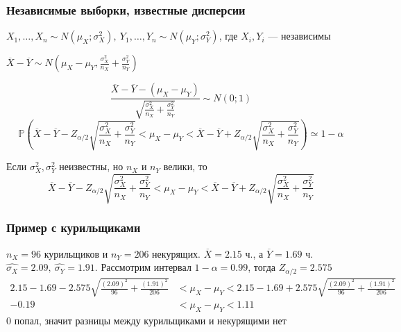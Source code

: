 \documentclass[a4paper, 10pt]{article}
\begin{document}
\subsubsection{Независимые выборки, известные дисперсии}
$X_1,\ldots,X_n\sim N(\mu_X;\sigma^2_X),\ Y_1,\ldots,Y_n\sim N(\mu_Y;\sigma^2_Y)$, где $X_i,Y_i$ — независимы

$\overline{X}-\overline{Y}\sim N(\mu_X-\mu_Y,\frac{\sigma^2_X}{n_X}+\frac{\sigma^2_Y}{n_Y})$

\begin{equation*}
    \frac{\overline{X}-\overline{Y}-(\mu_X-\mu_Y)}{\sqrt{\frac{\sigma^2_X}{n_X}+\frac{\sigma^2_Y}{n_Y}}}\sim N(0;1)
\end{equation*}
\begin{equation*}
    \mathbb{P}\left(\overline{X}-\overline{Y}-Z_{\alpha/2}\sqrt{\frac{\sigma^2_X}{n_X}+\frac{\sigma^2_Y}{n_Y}}<\mu_X-\mu_Y<\overline{X}-\overline{Y}+Z_{\alpha/2}\sqrt{\frac{\sigma^2_X}{n_X}+\frac{\sigma^2_Y}{n_Y}}\right)\simeq1-\alpha
\end{equation*}

\comment Если $\sigma^2_X,\sigma^2_Y$ неизвестны, но $n_X$ и $n_Y$ велики, то 
\begin{equation*}
    \overline{X}-\overline{Y}-Z_{\alpha/2}\sqrt{\frac{\sigma^2_X}{n_X}+\frac{\sigma^2_Y}{n_Y}}<\mu_X-\mu_Y<\overline{X}-\overline{Y}+Z_{\alpha/2}\sqrt{\frac{\sigma^2_X}{n_X}+\frac{\sigma^2_Y}{n_Y}}
\end{equation*}

\subsubsection{Пример с курильщиками}
$n_X=96$ курильщиков и $n_Y=206$ некурящих. $\overline{X}=2.15$ ч., а $\overline{Y}=1.69$ ч. $\widehat{\sigma_X}=2.09,\ \widehat{\sigma_Y}=1.91$. Рассмотрим интервал $1-\alpha=0.99$, тогда $Z_{\alpha/2}=2.575$
\begin{equation*}
    \begin{aligned}
        2.15-1.69-2.575\sqrt{\frac{(2.09)^2}{96}+\frac{(1.91)^2}{206}}&<\mu_X-\mu_Y<2.15-1.69+2.575\sqrt{\frac{(2.09)^2}{96}+\frac{(1.91)^2}{206}}\\
        -0.19&<\mu_X-\mu_Y<1.11
    \end{aligned}
\end{equation*}
0 попал, значит разницы между курильщиками и некурящими нет
\end{document}
